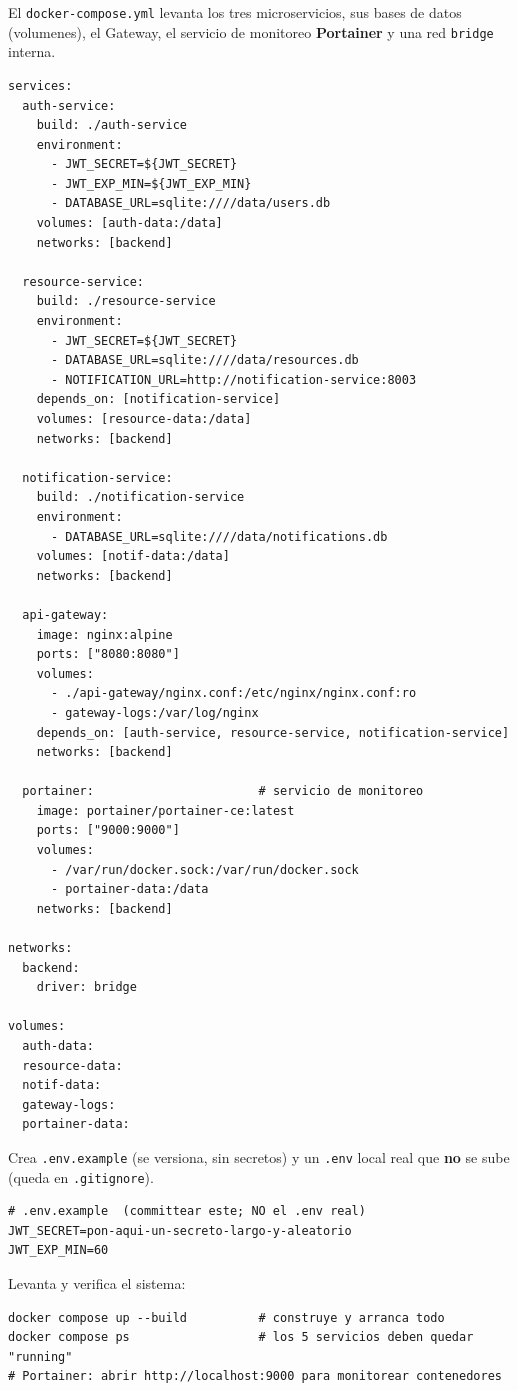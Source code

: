 \documentclass[11pt]{article}
\begin{document}
El \texttt{docker-compose.yml} levanta los tres microservicios, sus bases de datos (volumenes), el Gateway, el servicio de monitoreo \textbf{Portainer} y una red \texttt{bridge} interna.

\begin{lstlisting}[language=yamlx]
services:
  auth-service:
    build: ./auth-service
    environment:
      - JWT_SECRET=${JWT_SECRET}
      - JWT_EXP_MIN=${JWT_EXP_MIN}
      - DATABASE_URL=sqlite:////data/users.db
    volumes: [auth-data:/data]
    networks: [backend]

  resource-service:
    build: ./resource-service
    environment:
      - JWT_SECRET=${JWT_SECRET}
      - DATABASE_URL=sqlite:////data/resources.db
      - NOTIFICATION_URL=http://notification-service:8003
    depends_on: [notification-service]
    volumes: [resource-data:/data]
    networks: [backend]

  notification-service:
    build: ./notification-service
    environment:
      - DATABASE_URL=sqlite:////data/notifications.db
    volumes: [notif-data:/data]
    networks: [backend]

  api-gateway:
    image: nginx:alpine
    ports: ["8080:8080"]
    volumes:
      - ./api-gateway/nginx.conf:/etc/nginx/nginx.conf:ro
      - gateway-logs:/var/log/nginx
    depends_on: [auth-service, resource-service, notification-service]
    networks: [backend]

  portainer:                       # servicio de monitoreo
    image: portainer/portainer-ce:latest
    ports: ["9000:9000"]
    volumes:
      - /var/run/docker.sock:/var/run/docker.sock
      - portainer-data:/data
    networks: [backend]

networks:
  backend:
    driver: bridge

volumes:
  auth-data:
  resource-data:
  notif-data:
  gateway-logs:
  portainer-data:
\end{lstlisting}

Crea \texttt{.env.example} (se versiona, sin secretos) y un \texttt{.env} local real que \textbf{no} se sube (queda en \texttt{.gitignore}).
\begin{lstlisting}
# .env.example  (committear este; NO el .env real)
JWT_SECRET=pon-aqui-un-secreto-largo-y-aleatorio
JWT_EXP_MIN=60
\end{lstlisting}

Levanta y verifica el sistema:
\begin{lstlisting}[language=shell]
docker compose up --build          # construye y arranca todo
docker compose ps                  # los 5 servicios deben quedar "running"
# Portainer: abrir http://localhost:9000 para monitorear contenedores
\end{lstlisting}
\end{document}
